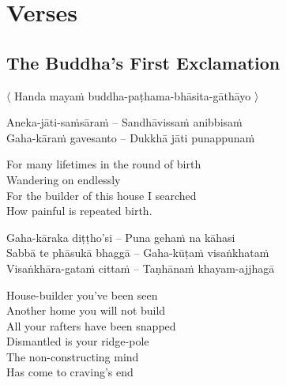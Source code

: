 
\chapter{Verses}

\section{The Buddha's First Exclamation}
\label{buddhas-first-exclamation}

\begin{leader}
  〈 Handa mayaṁ buddha-paṭhama-bhāsita-gāthāyo 〉

\end{leader}

\begin{twochants}
  Aneka-jāti-saṁsāraṁ – Sandhāvissaṁ anibbisaṁ\\
  Gaha-kāraṁ gavesanto – Dukkhā jāti punappunaṁ\\
\end{twochants}

\begin{english-verses}
  For many lifetimes in the round of birth\\
  Wandering on endlessly\\
  For the builder of this house I searched\\
  How painful is repeated birth.
\end{english-verses}

\begin{twochants}
  Gaha-kāraka diṭṭho'si – Puna gehaṁ na kāhasi\\
  Sabbā te phāsukā bhaggā – Gaha-kūṭaṁ visaṅkhataṁ\\
  Visaṅkhāra-gataṁ cittaṁ – Taṇhānaṁ khayam-ajjhagā\\
\end{twochants}

\begin{english-verses}
  House-builder you've been seen\\
  Another home you will not build\\
  All your rafters have been snapped\\
  Dismantled is your ridge-pole\\
  The non-constructing mind\\
  Has come to craving's end
\end{english-verses}

